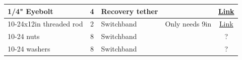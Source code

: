 \begin{table}
\begin{tabular}{| p{2in} | c | p{1in} | p{1in} | c |}
        \hline
        1/4" Eyebolt               & 4        & Recovery tether         &                                           & \href{https://www.allrockets.ca/Build/Swivels-Links/Eye-Bolt-1}{Link}                                                                                                                                                                                                                                                                                                                                                                                                                                                                                                                                         \\
        \hline
        10-24x12in threaded rod    & 2        & Switchband              & Only needs 9in                            & \href{https://www.homedepot.ca/product/paulin--10-24-x-12-inch-fully-threaded-steel-rod-zinc-plated-unc/1000798814}{Link}                                                                                                                                                                                                                                                                                                                                                                                                                                                                                     \\
        \hline
        10-24 nuts                 & 8        & Switchband              &                                           & ?                                                                                                                                                                                                                                                                                                                                                                                                                                                                                                                                                                                                             \\
        \hline
        10-24 washers              & 8        & Switchband              &                                           & ?                                                                                                                                                                                                                                                                                                                                                                                                                                                                                                                                                                                                             \\

\end{tabular}
\end{table}

